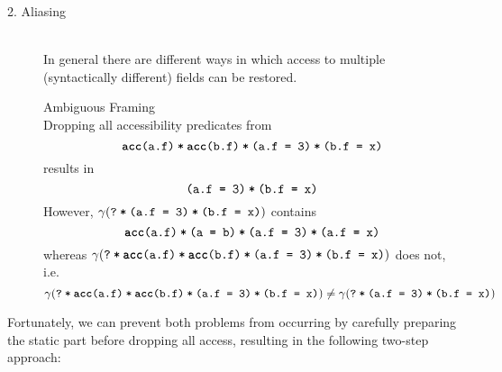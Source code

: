 \begin{proofatend}
\begin{description}
        \item[2. Aliasing]~\\
        In general there are different ways in which access to multiple (syntactically different) fields can be restored.
        \begin{example}{Ambiguous Framing}\label{ex:rem-acc-1x}~\\
            Dropping all accessibility predicates from $$\phiCons{\phiCons{\phiAcc{a}{f}}{\phiAcc{b}{f}}}{\phiCons{\phiEq{a.f}{3}}{\phiEq{b.f}{x}}}$$
            results in
            $$\phiCons{\phiEq{a.f}{3}}{\phiEq{b.f}{x}}$$
            However, $\gamma(\withqm{\phiCons{\phiEq{a.f}{3}}{\phiEq{b.f}{x}}})$ contains
            $$\phiCons{\phiCons{\phiAcc{a}{f}}{\phiEq{a}{b}}}{\phiCons{\phiEq{a.f}{3}}{\phiEq{a.f}{x}}}$$
            whereas $\gamma(\withqm{\phiCons{\phiCons{\phiAcc{a}{f}}{\phiAcc{b}{f}}}{\phiCons{\phiEq{a.f}{3}}{\phiEq{b.f}{x}}}})$
            does not, i.e.
            \begin{displaymath}
            \gamma(\withqm{\phiCons{\phiCons{\phiAcc{a}{f}}{\phiAcc{b}{f}}}{\phiCons{\phiEq{a.f}{3}}{\phiEq{b.f}{x}}}}) \neq
            \gamma(\withqm{\phiCons{\phiEq{a.f}{3}}{\phiEq{b.f}{x}}})
            \end{displaymath}
        \end{example}
    \end{description}
    
    Fortunately, we can prevent both problems from occurring by carefully preparing the static part before dropping all access, resulting in the following two-step approach:
    

\end{proofatend}
